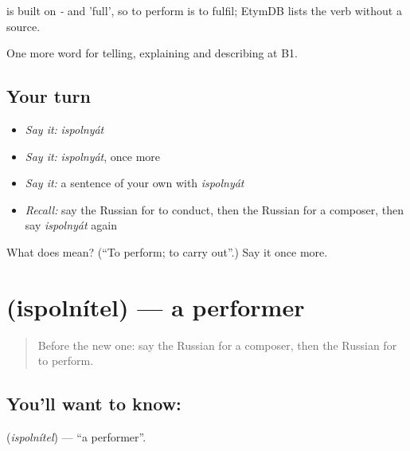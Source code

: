 \begin{cousinweb}
\emph{} is built on \emph{-} and \emph{} 'full', so to perform is to fulfil; EtymDB lists the verb without a source.
\end{cousinweb}

\begin{grammarlens}[title={What you've built}]
One more word for telling, explaining and describing at B1.
\end{grammarlens}

\subsection*{Your turn}
\begin{itemize}
\raggedright
  \item \emph{Say it:} \emph{ispolnyát}
  \item \emph{Say it:} \emph{ispolnyát}, once more
  \item \emph{Say it:} a sentence of your own with \emph{ispolnyát}
  \item \emph{Recall:} say the Russian for to conduct, then the Russian for a composer, then say \emph{ispolnyát} again
\end{itemize}

\begin{tcolorbox}[breakable,colback=teal!4,colframe=teal!35!black,title={Before you move on}]
What does  mean? (\textquotedblleft{}To perform; to carry out\textquotedblright{}.) Say it once more.
\end{tcolorbox}
\section[\texorpdfstring{\ru{исполнитель} (ispolnítel)}{исполнитель (ispolnítel)}]{ (ispolnítel) — a performer}

\label{lesson:RU-C518-ispolnitel}



\begin{quote}
Before the new one: say the Russian for a composer, then the Russian for to perform.
\end{quote}

\subsection*{You'll want to know: }
\textbf{} (\emph{ispolnítel}) — \textquotedblleft{}a performer\textquotedblright{}.

